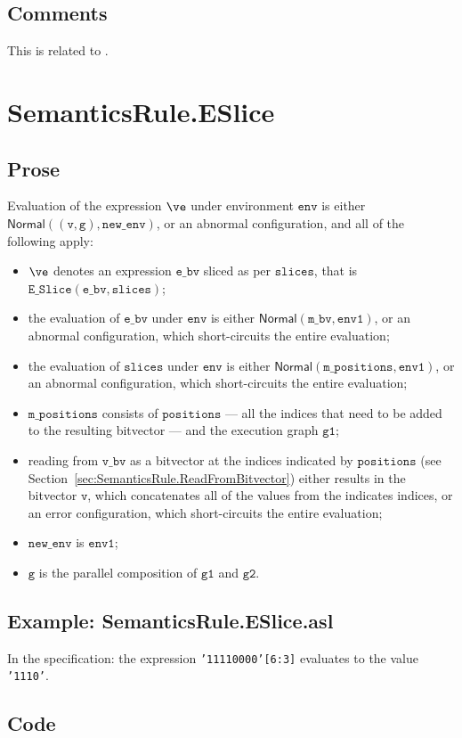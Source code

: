 \documentclass{book}
\newcommand\secref[1]{Section~\ref{sec:#1}}
\newcommand\ProseOrAbnormal[0]{or an abnormal configuration, which short-circuits the entire evaluation}
\newcommand\ProseOrError[0]{or an error configuration, which short-circuits the entire evaluation}
\newcommand\Normal[0]{\textsf{Normal}}
\newcommand\newenv[0]{\texttt{new\_env}}
\newcommand\env[0]{\texttt{env}}
\newcommand\envone[0]{\texttt{env1}}
\newcommand\vg[0]{\texttt{g}}
\newcommand\vv[0]{\texttt{v}}
\newcommand\vgone[0]{\texttt{g1}}
\newcommand\vgtwo[0]{\texttt{g2}}
\newcommand\ebv[0]{\texttt{e\_bv}}
\newcommand\mbv[0]{\texttt{m\_bv}}
\newcommand\vbv[0]{\texttt{v\_bv}}
\newcommand\mpositions[0]{\texttt{m\_positions}}
\newcommand\slices[0]{\texttt{slices}}
\newcommand\positions[0]{\texttt{positions}}
\begin{document}
  \subsection{Comments}
  This is related to .

\section{SemanticsRule.ESlice \label{sec:SemanticsRule.ESlice}}
  \subsection{Prose}
  Evaluation of the expression $\ve$ under environment $\env$ is either $\Normal((\vv, \vg), \newenv)$,
  or an abnormal configuration, and all of the following apply:
  \begin{itemize}
    \item $\ve$ denotes an expression $\ebv$ sliced as per $\slices$,
    that is $\texttt{E\_Slice}(\ebv, \slices)$;
    \item the evaluation of $\ebv$ under $\env$ is either $\Normal(\mbv, \envone)$,
    \ProseOrAbnormal;
    \item the evaluation of $\slices$ under $\env$ is either $\Normal(\mpositions, \envone)$,
    \ProseOrAbnormal;
    \item $\mpositions$ consists of $\positions$ --- all the indices that need to be added to the
    resulting bitvector --- and the execution graph $\vgone$;
    \item reading from $\vbv$ as a bitvector at the indices indicated by $\positions$
    (see \secref{SemanticsRule.ReadFromBitvector}) either results in the bitvector $\vv$,
    which concatenates all of the values from the indicates indices,
    \ProseOrError;
    \item $\newenv$ is $\envone$;
    \item $\vg$ is the parallel composition of $\vgone$ and $\vgtwo$.
  \end{itemize}

  \subsection{Example: SemanticsRule.ESlice.asl}
    In the specification:
    the expression \texttt{'11110000'[6:3]} evaluates to the value \texttt{'1110'}.

  \subsection{Code}
\end{document}
